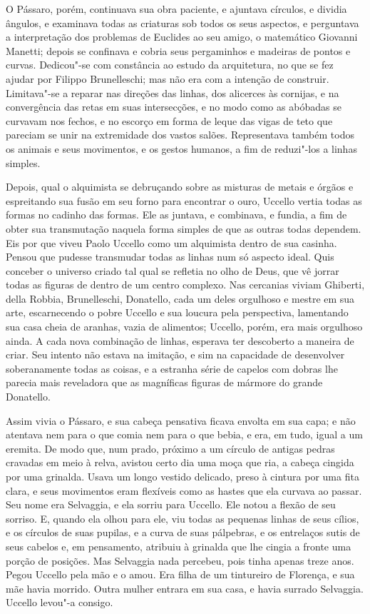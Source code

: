O Pássaro, porém, continuava sua obra paciente, e ajuntava círculos, e
dividia ângulos, e examinava todas as criaturas sob todos os seus
aspectos, e perguntava a interpretação dos problemas de Euclides ao seu
amigo, o matemático Giovanni Manetti; depois se confinava e cobria seus
pergaminhos e madeiras de pontos e curvas. Dedicou"-se com constância ao
estudo da arquitetura, no que se fez ajudar por Filippo Brunelleschi; mas
não era com a intenção de construir. Limitava"-se a reparar nas direções
das linhas, dos alicerces às cornijas, e na convergência das retas em suas
intersecções, e no modo como as abóbadas se curvavam nos fechos, e no
escorço em forma de leque das vigas de teto que pareciam se unir na
extremidade dos vastos salões. Representava também todos os animais e seus
movimentos, e os gestos humanos, a fim de reduzi"-los a linhas simples.

Depois, qual o alquimista se debruçando sobre as misturas de metais e
órgãos e espreitando sua fusão em seu forno para encontrar o ouro, Uccello
vertia todas as formas no cadinho das formas. Ele as juntava, e combinava,
e fundia, a fim de obter sua transmutação naquela forma simples de que as
outras todas dependem. Eis por que viveu Paolo Uccello como um alquimista
dentro de sua casinha. Pensou que pudesse transmudar todas as linhas num
só aspecto ideal. Quis conceber o universo criado tal qual se refletia no
olho de Deus, que vê jorrar todas as figuras de dentro de um centro
complexo. Nas cercanias viviam Ghiberti, della Robbia, Brunelleschi,
Donatello, cada um deles orgulhoso e mestre em sua arte, escarnecendo o
pobre Uccello e sua loucura pela perspectiva, lamentando sua casa cheia de
aranhas, vazia de alimentos; Uccello, porém, era mais orgulhoso ainda. A
cada nova combinação de linhas, esperava ter descoberto a maneira de
criar. Seu intento não estava na imitação, e sim na capacidade de \label{intento}
desenvolver soberanamente todas as coisas, e a estranha série de capelos
com dobras lhe parecia mais reveladora que as magníficas figuras de
mármore do grande Donatello.

Assim vivia o Pássaro, e sua cabeça pensativa ficava envolta em sua capa; e
não atentava nem para o que comia nem para o que bebia, e era, em tudo,
igual a um eremita. De modo que, num prado, próximo a um círculo de
antigas pedras cravadas em meio à relva, avistou certo dia uma moça que
ria, a cabeça cingida por uma grinalda. Usava um longo vestido delicado,
preso à cintura por uma fita clara, e seus movimentos eram flexíveis como
as hastes que ela curvava ao passar. Seu nome era Selvaggia, e ela sorriu
para Uccello. Ele notou a flexão de seu sorriso. E, quando ela olhou para
ele, viu todas as pequenas linhas de seus cílios, e os círculos de suas
pupilas, e a curva de suas pálpebras, e os entrelaços sutis de seus
cabelos e, em pensamento, atribuiu à grinalda que lhe cingia a fronte uma
porção de posições. Mas Selvaggia nada percebeu, pois tinha apenas treze
anos. Pegou Uccello pela mão e o amou. Era filha de um tintureiro de
Florença, e sua mãe havia morrido. Outra mulher entrara em sua casa, e
havia surrado Selvaggia. Uccello levou"-a consigo.

